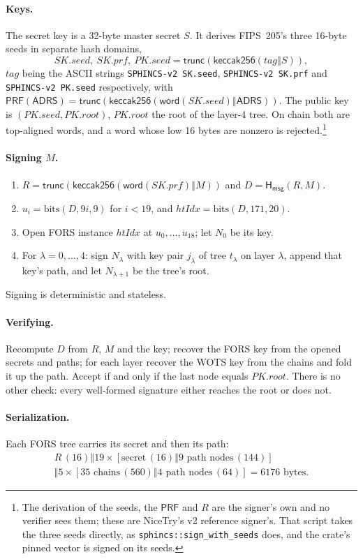 \documentclass[11pt]{article}
\newcommand{\concat}{\mathbin\Vert}
\newcommand{\K}{\mathsf{keccak256}}
\newcommand{\Hmsg}{\mathsf{H_{msg}}}
\newcommand{\PRF}{\mathsf{PRF}}
\newcommand{\ADRS}{\mathsf{ADRS}}
\newcommand{\slot}{\mathsf{word}}
\newcommand{\trunc}{\mathsf{trunc}}
\newcommand{\seed}{\mathit{PK.seed}}
\newcommand{\pkroot}{\mathit{PK.root}}
\newcommand{\skseed}{\mathit{SK.seed}}
\newcommand{\skprf}{\mathit{SK.prf}}
\newcommand{\htidx}{\mathit{htIdx}}
\begin{document}
\paragraph{Keys.} The secret key is a 32-byte master secret $S$. It derives FIPS~205's
three 16-byte seeds in separate hash domains,
\[
  \skseed,\ \skprf,\ \seed=\trunc\!\left(\K(\mathit{tag}\concat S)\right),
\]
$\mathit{tag}$ being the ASCII strings \texttt{SPHINCS-v2 SK.seed},
\texttt{SPHINCS-v2 SK.prf} and \texttt{SPHINCS-v2 PK.seed} respectively,
with $\PRF(\ADRS)=\trunc(\K(\slot(\skseed)\concat\ADRS))$. The public key is
$(\seed,\pkroot)$, $\pkroot$ the root of the layer-4 tree. On chain both are
top-aligned words, and a word whose low 16 bytes are nonzero is rejected.\footnote{The derivation of the seeds, the $\PRF$ and $R$ are the signer's own and no verifier sees them; these are NiceTry's v2 reference signer's. That script takes the three seeds directly, as \texttt{sphincs::sign\_with\_seeds} does, and the crate's pinned vector is signed on its seeds.}

\paragraph{Signing $M$.}
\begin{enumerate}
  \item $R=\trunc(\K(\slot(\skprf)\concat M))$ and $D=\Hmsg(R,M)$.
  \item $u_i=\mathrm{bits}(D,9i,9)$ for $i<19$, and $\htidx=\mathrm{bits}(D,171,20)$.
  \item Open FORS instance $\htidx$ at $u_0,\dots,u_{18}$; let $N_0$ be its key.
  \item For $\lambda=0,\dots,4$: sign $N_\lambda$ with key pair $j_\lambda$ of tree
        $t_\lambda$ on layer $\lambda$, append that key's path, and let $N_{\lambda+1}$
        be the tree's root.
\end{enumerate}
Signing is deterministic and stateless.

\paragraph{Verifying.} Recompute $D$ from $R$, $M$ and the key; recover the FORS key
from the opened secrets and paths; for each layer recover the WOTS key from the chains
and fold it up the path. Accept if and only if the last node equals $\pkroot$. There is
no other check: every well-formed signature either reaches the root or does not.

\paragraph{Serialization.} Each FORS tree carries its secret and then its path:
\begin{multline*}
  R\,(16)\concat 19\times\left[\text{secret}\,(16)\concat\text{9 path nodes}\,(144)\right]\\
  \concat 5\times\left[\text{35 chains}\,(560)\concat\text{4 path nodes}\,(64)\right]
  =6176\text{ bytes}.
\end{multline*}
\end{document}
